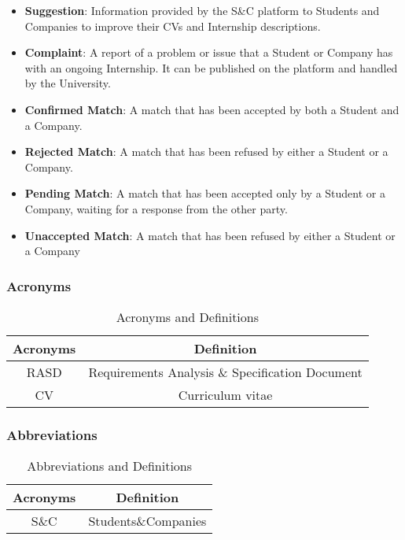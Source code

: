 \begin{itemize}
    \item \textcolor{titleColor}{\textbf{Suggestion}\label{def:suggestion}}: Information provided by the S\&C platform to Students and Companies to improve their CVs and Internship descriptions.
    \item \textcolor{titleColor}{\textbf{Complaint}\label{def:complaint}}: A report of a problem or issue that a Student or Company has with an ongoing Internship. It can be published on the platform and handled by the University.
    \item \textcolor{titleColor}{\textbf{Confirmed Match}\label{def:confirmedMatch}}: A match that has been accepted by both a Student and a Company.
    \item \textcolor{titleColor}{\textbf{Rejected Match}\label{def:rejectedMatch}}: A match that has been refused by either a Student or a Company.
    \item \textcolor{titleColor}{\textbf{Pending Match}\label{def:pendingMatch}}: A match that has been accepted only by a Student or a Company, waiting for a response from the other party.
    \item \textcolor{titleColor}{\textbf{Unaccepted Match}\label{def:unacceptedMatch}}: A match that has been refused by either a Student or a Company
    
    
\end{itemize}

\subsubsection{Acronyms}
\begin{table}[h]
    \centering
\begin{tabular}{|c|c|}
        \hline
        \textbf{Acronyms} & \textbf{Definition} \\ \hline
        RASD & Requirements Analysis \& Specification Document\\ \hline
        CV & Curriculum vitae\\ \hline
    \end{tabular}
    \caption{Acronyms and Definitions}
    \label{tab:acronyms}
\end{table}

\subsubsection{Abbreviations}
\begin{table}[h]
    \centering
\begin{tabular}{|c|c|}
        \hline
        \textbf{Acronyms} & \textbf{Definition} \\ \hline
        S\&C & Students\&Companies \\ \hline
    \end{tabular}
    \caption{Abbreviations and Definitions}
    \label{tab:abbreviations}
\end{table}

